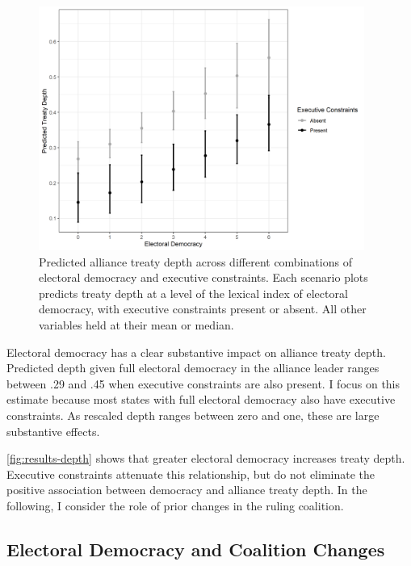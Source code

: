 \documentclass[12pt]{article}
\begin{document}
\begin{figure}[hbtp]
\centering
\includegraphics[width=0.95\textwidth]{../figures/results-depth.png}
\caption{Predicted alliance treaty depth across different combinations of electoral democracy and executive constraints. Each scenario plots predicts treaty depth at a level of the lexical index of electoral democracy, with executive constraints present or absent. All other variables held at their mean or median.}
\label{fig:results-depth}
\end{figure}


Electoral democracy has a clear substantive impact on alliance treaty depth.
Predicted depth given full electoral democracy in the alliance leader ranges between .29 and .45 when executive constraints are also present.
I focus on this estimate because most states with full electoral democracy also have executive constraints. 
As rescaled depth ranges between zero and one, these are large substantive effects.


\autoref{fig:results-depth} shows that greater electoral democracy increases treaty depth. 
Executive constraints attenuate this relationship, but do not eliminate the positive association between democracy and alliance treaty depth. 
In the following, I consider the role of prior changes in the ruling coalition. 


\subsection{Electoral Democracy and Coalition Changes}
\end{document}
